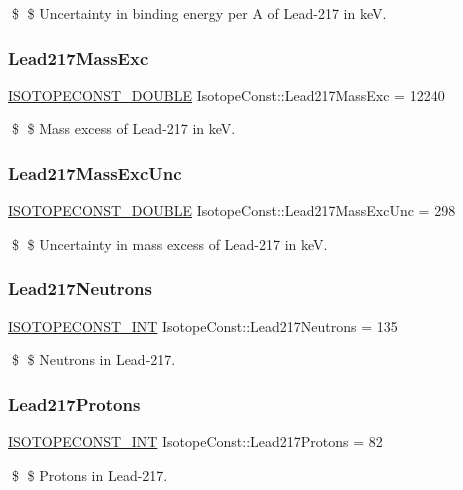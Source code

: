 \$ \$ Uncertainty in binding energy per A of Lead-\/217 in keV. \mbox{\label{group___isotope_const-_lead-_pb217_gab860eedaa3704a78c3c7ef777b53b041}} 
\subsubsection{\texorpdfstring{Lead217\+Mass\+Exc}{Lead217MassExc}}
{\footnotesize\ttfamily \mbox{\hyperlink{group___isotope_const-_macros_ga8f45a7272ce02c0b4c65c44636ed719a}{I\+S\+O\+T\+O\+P\+E\+C\+O\+N\+S\+T\+\_\+\+D\+O\+U\+B\+LE}} Isotope\+Const\+::\+Lead217\+Mass\+Exc = 12240}

\$ \$ Mass excess of Lead-\/217 in keV. \mbox{\label{group___isotope_const-_lead-_pb217_gad2b0f2528ed0e4841201850c04decd08}} 
\subsubsection{\texorpdfstring{Lead217\+Mass\+Exc\+Unc}{Lead217MassExcUnc}}
{\footnotesize\ttfamily \mbox{\hyperlink{group___isotope_const-_macros_ga8f45a7272ce02c0b4c65c44636ed719a}{I\+S\+O\+T\+O\+P\+E\+C\+O\+N\+S\+T\+\_\+\+D\+O\+U\+B\+LE}} Isotope\+Const\+::\+Lead217\+Mass\+Exc\+Unc = 298}

\$ \$ Uncertainty in mass excess of Lead-\/217 in keV. \mbox{\label{group___isotope_const-_lead-_pb217_gafe412f2c06e92d44f93a5d2276e925a5}} 
\subsubsection{\texorpdfstring{Lead217\+Neutrons}{Lead217Neutrons}}
{\footnotesize\ttfamily \mbox{\hyperlink{group___isotope_const-_macros_ga5f18360b3e99483a35c32d789e62621c}{I\+S\+O\+T\+O\+P\+E\+C\+O\+N\+S\+T\+\_\+\+I\+NT}} Isotope\+Const\+::\+Lead217\+Neutrons = 135}

\$ \$ Neutrons in Lead-\/217. \mbox{\label{group___isotope_const-_lead-_pb217_ga8af9bf22294479db86f2deee84226906}} 
\subsubsection{\texorpdfstring{Lead217\+Protons}{Lead217Protons}}
{\footnotesize\ttfamily \mbox{\hyperlink{group___isotope_const-_macros_ga5f18360b3e99483a35c32d789e62621c}{I\+S\+O\+T\+O\+P\+E\+C\+O\+N\+S\+T\+\_\+\+I\+NT}} Isotope\+Const\+::\+Lead217\+Protons = 82}

\$ \$ Protons in Lead-\/217. 